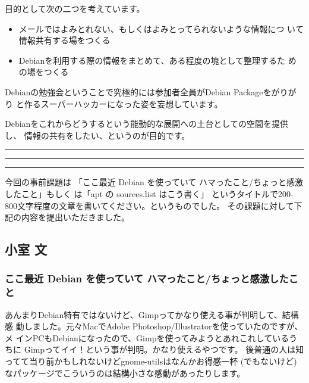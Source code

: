 \documentclass[mingoth,a4paper]{jsarticle}
\begin{document}
 目的として次の二つを考えています。

 \begin{itemize}
 \item メールではよみとれない、もしくはよみとってられないような情報につ
       いて情報共有する場をつくる
 \item Debianを利用する際の情報をまとめて、ある程度の塊として整理するた
       めの場をつくる
 \end{itemize}

 Debianの勉強会ということで究極的には参加者全員がDebian Packageをがりがり
 と作るスーパーハッカーになった姿を妄想しています。

 Debianをこれからどうするという能動的な展開への土台としての空間を提供し、
 情報の共有をしたい、というのが目的です。


\newpage

\begin{minipage}[b]{0.2\hsize}
 \colorbox{dancerlightblue}{}
\end{minipage}
\begin{minipage}[b]{0.8\hsize}
\hrule
\vspace{2mm}
\hrule
\setcounter{tocdepth}{1}
\tableofcontents
\vspace{2mm}
\hrule
\end{minipage}


今回の事前課題は
「ここ最近 Debian を使っていて ハマったこと/ちょっと感激したこと」もしく
は「apt の sources.list はこう書く」
というタイトルで200-800文字程度の文章を書いてください。というものでした。
その課題に対して下記の内容を提出いただきました。

\subsection{小室 文}

\subsubsection{ここ最近 Debian を使っていて ハマったこと/ちょっと感激したこと}

あんまりDebian特有ではないけど、Gimpってかなり使える事が判明して、結構感
動しました。元々MacでAdobe Photoshop/Illustratorを使っていたのですが、メ
インPCもDebianになったので、Gimpを使ってみようとあれこれしているうちに
Gimpってイイ！という事が判明。かなり使えるやつです。
後普通の人は知ってて当り前かもしれないけどgnome-utilsはなんかお得感一杯
(でもないけど)なパッケージでこういうのは結構小さな感動があったりします。
\end{document}
